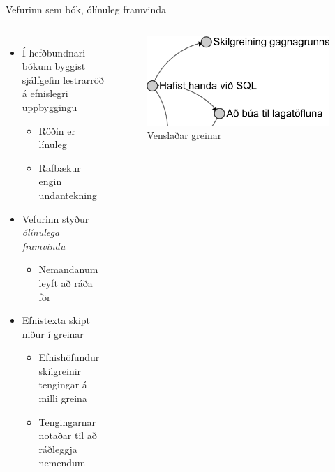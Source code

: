 \documentclass[hi-blar]{beamer}
\begin{document}
\begin{frame}{Vefurinn sem bók, ólínuleg framvinda}
    \begin{columns}
        \begin{itemize}
            \item Í hefðbundnari bókum byggist sjálfgefin lestrarröð á efnislegri uppbyggingu
            \begin{itemize}
                \item Röðin er línuleg
                \item Rafbækur engin undantekning
            \end{itemize}
            \item Vefurinn styður \emph{ólínulega framvindu}
            \begin{itemize}
                \item Nemandanum leyft að ráða för
            \end{itemize}
            \item Efnistexta skipt niður í greinar
            \begin{itemize}
                \item Efnishöfundur skilgreinir tengingar á milli greina
                \item Tengingarnar notaðar til að ráðleggja nemendum
            \end{itemize}
        \end{itemize}
        \begin{figure}
            \caption{Venslaðar greinar}
            \includegraphics[width=\textwidth]{relational-sections}
        \end{figure}
    \end{columns}
\end{frame}
\end{document}
